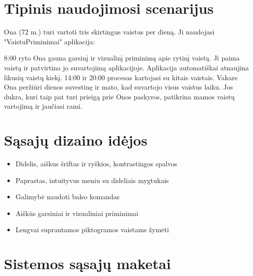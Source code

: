 \documentclass[14pt]{extarticle}
\begin{document}
\clearpage

\section{Tipinis naudojimosi scenarijus}

Ona (72 m.) turi vartoti tris skirtingus vaistus per dieną. Ji naudojasi "VaistuPriminimai" aplikacija:

8:00 ryto Ona gauna garsinį ir vizualinį priminimą apie rytinį vaistą.
Ji paima vaistą ir patvirtina jo suvartojimą aplikacijoje.
Aplikacija automatiškai atnaujina likusių vaistų kiekį.
14:00 ir 20:00 procesas kartojasi su kitais vaistais.
Vakare Ona peržiūri dienos suvestinę ir mato, kad suvartojo visus vaistus laiku.
Jos dukra, kuri taip pat turi prieigą prie Onos paskyros, patikrina mamos vaistų vartojimą ir jaučiasi rami.

\section{Sąsajų dizaino idėjos}

\begin{itemize}
	\item Didelis, aiškus šriftas ir ryškios, kontrastingos spalvos
	\item Paprastas, intuityvus meniu su dideliais mygtukais
	\item Galimybė naudoti balso komandas
	\item Aiškūs garsiniai ir vizualiniai priminimai
	\item Lengvai suprantamos piktogramos vaistams žymėti
\end{itemize}

\clearpage

\section{Sistemos sąsajų maketai}
\end{document}
